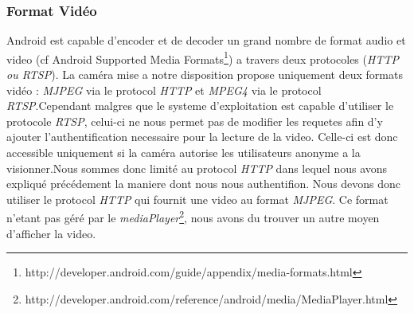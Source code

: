 \subsubsection{Format Vidéo}
Android est capable d'encoder et de decoder un grand nombre de format audio et
video (cf Android Supported Media Formats\footnote{\label{mediaFormat}
http://developer.android.com/guide/appendix/media-formats.html}) a travers
deux protocoles (\textit{HTTP ou RTSP}).\newline
La caméra mise a notre disposition propose uniquement deux formats vidéo :
\textit{MJPEG} via le protocol \textit{HTTP} et \textit{MPEG4} via le protocol
\textit{RTSP}.\newline Cependant malgres que le systeme d'exploitation est
capable d'utiliser le protocole \textit{RTSP}, celui-ci ne nous permet pas de
modifier les requetes afin d'y ajouter l'authentification necessaire pour la
lecture de la video. Celle-ci est donc accessible uniquement si la caméra
autorise les utilisateurs anonyme a la visionner.\newline Nous sommes donc
limité au protocol \textit{HTTP} dans lequel nous avons expliqué précédement
la maniere dont nous nous authentifion.\newline\newline
Nous devons donc utiliser le protocol \textit{HTTP} qui fournit une video au
format \textit{MJPEG}. Ce format n'etant pas géré par le
\textit{mediaPlayer}\footnote{\label{mediaPlayer}
http://developer.android.com/reference/android/media/MediaPlayer.html}, nous
avons du trouver un autre moyen d'afficher la video.
